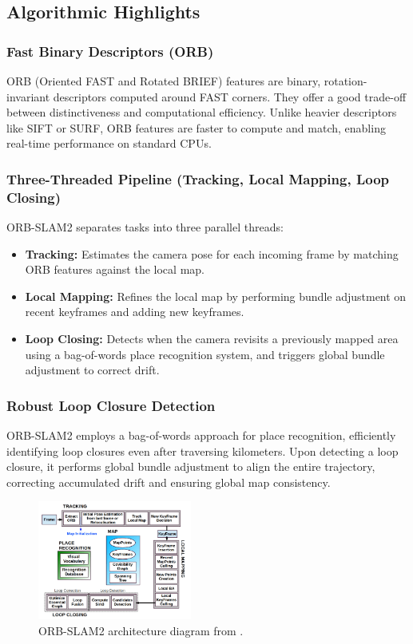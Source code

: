 \documentclass[conference]{IEEEtran}
\begin{document}
\subsection{Algorithmic Highlights}
\subsubsection{Fast Binary Descriptors (ORB)}
ORB (Oriented FAST and Rotated BRIEF) features are binary, rotation-invariant descriptors computed around FAST corners. They offer a good trade-off between distinctiveness and computational efficiency. Unlike heavier descriptors like SIFT or SURF, ORB features are faster to compute and match, enabling real-time performance on standard CPUs.

\subsubsection{Three-Threaded Pipeline (Tracking, Local Mapping, Loop Closing)}
ORB-SLAM2 separates tasks into three parallel threads:

\begin{itemize}
    \item \textbf{Tracking:} Estimates the camera pose for each incoming frame by matching ORB features against the local map.
    \item \textbf{Local Mapping:} Refines the local map by performing bundle adjustment on recent keyframes and adding new keyframes.
    \item \textbf{Loop Closing:} Detects when the camera revisits a previously mapped area using a bag-of-words place recognition system, and triggers global bundle adjustment to correct drift.
\end{itemize}

\subsubsection{Robust Loop Closure Detection}
ORB-SLAM2 employs a bag-of-words approach for place recognition, efficiently identifying loop closures even after traversing kilometers. Upon detecting a loop closure, it performs global bundle adjustment to align the entire trajectory, correcting accumulated drift and ensuring global map consistency.

\begin{figure}[htbp]
\centerline{\includegraphics[width=0.45\textwidth]{orb_slam2.png}}
\caption{ORB-SLAM2 architecture diagram from \cite{1}.}
\label{fig:orb_slam2}
\end{figure}
\end{document}

